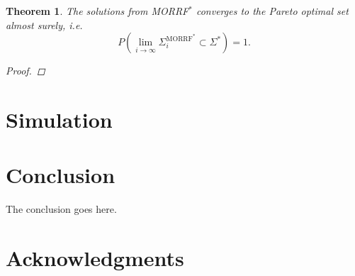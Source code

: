 \documentclass[conference]{IEEEtran}
\newtheorem{thm}{Theorem}
\theoremstyle{definition}
\begin{document}
\begin{thm}
	\label{thm:morrt:conv}
	The solutions from MORRF$^{*} $ converges to the Pareto optimal set almost surely, i.e.
	\begin{equation}
	P( \lim_{ i \rightarrow \infty }  \Sigma^{\mbox{MORRF}^{*}}_{i}  \subset \Sigma^{*} ) = 1.
	\end{equation}
	\begin{proof}
	\end{proof}
\end{thm}

\section{Simulation}
\label{sec:simulation}


\section{Conclusion} 
\label{sec:conclusion}

The conclusion goes here.

\section*{Acknowledgments}




\end{document}
